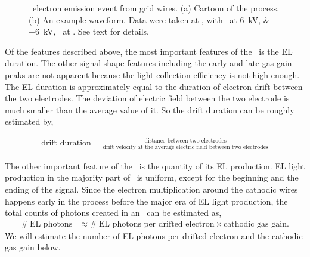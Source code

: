 \begin{figure}[!htbp]
\begin{subfigure}[b]{0.8\textwidth}
	\caption{}
	\label{fig:ElectronEmissionPulse c}
\end{subfigure}
	\caption[\gtest\ electron emission event from grid wires]{\gtest\ electron emission event from grid wires. (a) Cartoon of the process. (b) An example waveform. Data were taken at , with \opvtvb\ at \SIlist{+6;-6}{kV}, \opgd\ at \standarddensity . See text for details.}
	\label{fig:ElectronEmissionPulse}
\end{figure}

Of the features described above, the most important features of  the \ees\ is the EL duration. The other signal shape features including the early and late gas gain peaks are not apparent because the light collection efficiency is not high enough. The EL duration is approximately equal to the duration of electron drift between the two electrodes. The deviation of electric field between the two electrode is much smaller than the average value of it. So the drift duration can be roughly estimated by, 

\begin{align}
\text{drift duration} = \frac{\text{distance between two electrodes}}{\text{drift velocity at the average electric field between two electrodes} }
\end{align}

The other important feature of the \ees\ is the quantity of its EL production. EL light production in the majority part of \ees\ is uniform, except for the beginning and the ending of the signal. Since the electron multiplication around the cathodic wires happens early in the process before the major era of EL light production, the total counts of photons created in an \ees\  can be estimated as,
\begin{align}
\#\ \text{EL photons} & \approx \#\ \text{EL photons per drifted electron} \times \text{cathodic gas gain}.
\end{align}
We will estimate the number of EL photons per drifted electron and the cathodic gas gain below.

